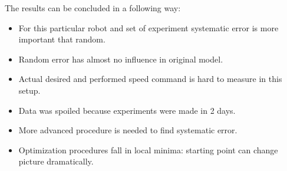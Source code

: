 \documentclass[a4paper, 12pt]{article}
\begin{document}
The results can be concluded in a following way:
\begin{itemize}
\item For this particular robot and set of experiment systematic error is more important that random.
\item Random error has almost no influence in original model.
\item Actual desired and performed speed command is hard to measure in this setup.
\item Data was spoiled because experiments were made in 2 days.
\item More advanced procedure is needed to find systematic error.
\item Optimization procedures fall in local minima: starting point can change picture dramatically.
\end{itemize}
\end{document}
